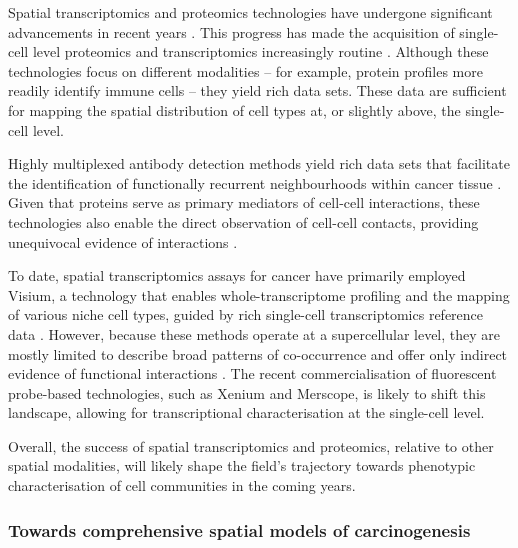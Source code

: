 Spatial transcriptomics and proteomics technologies have undergone significant advancements in recent years \parencite{Lewis2021-ic, Mund2022-kf}. This progress has made the acquisition of single-cell level proteomics and transcriptomics increasingly routine . Although these technologies focus on different modalities -- for example, protein profiles more readily identify immune cells -- they yield rich data sets. These data are sufficient for mapping the spatial distribution of cell types at, or slightly above, the single-cell level.

Highly multiplexed antibody detection methods yield rich data sets that facilitate the identification of functionally recurrent neighbourhoods within cancer tissue \parencite{Danenberg2022-zb, Jackson2020-em, Nirmal2022-sq, Schurch2020-lp, Wang2023-bo}. Given that proteins serve as primary mediators of cell-cell interactions, these technologies also enable the direct observation of cell-cell contacts, providing unequivocal evidence of interactions \parencite{Nirmal2022-sq, Wang2023-bo}.

To date, spatial transcriptomics assays for cancer have primarily employed \ac{Visium}, a technology that enables whole-transcriptome profiling and the mapping of various niche cell types, guided by rich single-cell transcriptomics reference data \parencite{Andersson2021-pu, Stahl2016-nq, Wu2021-uq, Berglund2018-gh, Moncada2020-ck, Qi2022-by, Ji2020-gn, Ravi2022-ut, Wu2021-wb, Gouin2021-zx, Barkley2022-gx, Erickson2022-zh}. However, because these methods operate at a supercellular level, they are mostly limited to describe broad patterns of co-occurrence and offer only indirect evidence of functional interactions . The recent commercialisation of fluorescent probe-based technologies, such as \ac{Xenium} and \ac{Merscope}, is likely to shift this landscape, allowing for transcriptional characterisation at the single-cell level.

Overall, the success of spatial transcriptomics and proteomics, relative to other spatial modalities, will likely shape the field's trajectory towards phenotypic characterisation of cell communities in the coming years.

\subsubsection*{Towards comprehensive spatial models of carcinogenesis}

